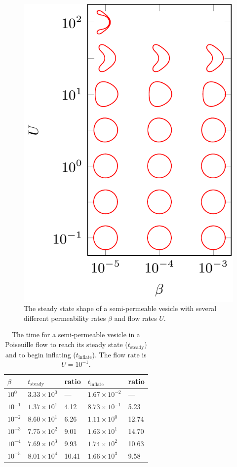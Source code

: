 \documentclass[9pt,twocolumn,twoside,lineno]{pnas-new}
\newif\ifTikz
\begin{document}
\begin{figure}[htp]
%  
  \includegraphics[width=0.8\linewidth]{figures/parabolicPhaseDiagram.pdf}
  \caption{\label{fig:parabolicPhaseDiagram} The steady state shape of a
  semi-permeable vesicle with several different permeability rates
  $\beta$ and flow rates $U$.}
\end{figure}


\begin{table}[htp]
  \centering
  \caption{\label{tbl:parabolicRelaxTimes1} The time for a
  semi-permeable vesicle in a Poiseuille flow to reach its steady state
  ($t_\mathrm{steady}$) and to begin inflating ($t_\mathrm{inflate}$).
  The flow rate is $U = 10^{-1}$.}
  \begin{tabular}{C{0.8cm}C{2cm}C{0.8cm}C{2cm}C{0.8cm}}
    $\beta$ & $t_\mathrm{steady}$ & ratio & $t_\mathrm{inflate}$ & ratio \\
    \midrule
    $10^{0}$  & $3.33 \times 10^{0}$ & ---  
              & $1.67 \times 10^{-2}$ & --- \\ 
    $10^{-1}$ & $1.37 \times 10^{1}$ & 4.12 & 
                $8.73 \times 10^{-1}$ & 5.23 \\
    $10^{-2}$ & $8.60 \times 10^{1}$ & 6.26 & 
                $1.11 \times 10^{0}$ & 12.74 \\
    $10^{-3}$ & $7.75 \times 10^{2}$ & 9.01 & 
                $1.63 \times 10^{1}$ & 14.70 \\
    $10^{-4}$ & $7.69 \times 10^{3}$ & 9.93 & 
                $1.74 \times 10^{2}$ & 10.63 \\
    $10^{-5}$ & $8.01 \times 10^{4}$ & 10.41 & 
                $1.66 \times 10^{3}$ & 9.58 \\
    \bottomrule
  \end{tabular}
\end{table}
\end{document}
